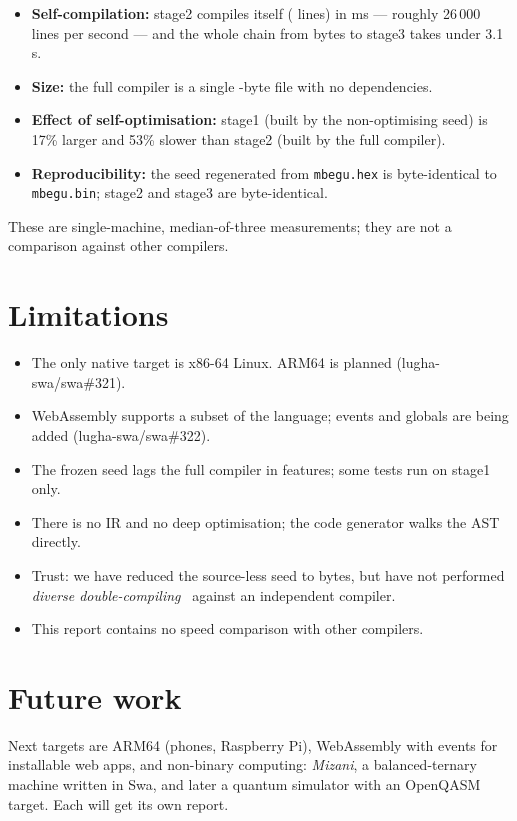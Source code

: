\documentclass[11pt,a4paper]{article}
\begin{document}
\begin{itemize}
  \item \textbf{Self-compilation:} stage2 compiles itself (\ZimaMistari{} lines) in \MudaStageMbili{} ms --- roughly 26\,000 lines per second --- and the whole chain from \KwanzaBaiti{} bytes to stage3 takes under 3.1\,s.
  \item \textbf{Size:} the full compiler is a single \StageMbiliBaiti-byte file with no dependencies.
  \item \textbf{Effect of self-optimisation:} stage1 (built by the non-optimising seed) is 17\% larger and 53\% slower than stage2 (built by the full compiler).
  \item \textbf{Reproducibility:} the seed regenerated from \texttt{mbegu.hex} is byte-identical to \texttt{mbegu.bin}; stage2 and stage3 are byte-identical.
\end{itemize}

\noindent These are single-machine, median-of-three measurements; they are not a comparison against other compilers.

\section{Limitations}

\begin{itemize}
  \item The only native target is x86-64 Linux. ARM64 is planned (lugha-swa/swa\#321).
  \item WebAssembly supports a subset of the language; events and globals are being added (lugha-swa/swa\#322).
  \item The frozen seed lags the full compiler in features; some tests run on stage1 only.
  \item There is no IR and no deep optimisation; the code generator walks the AST directly.
  \item Trust: we have reduced the source-less seed to \KwanzaBaiti{} bytes, but have not performed \emph{diverse double-compiling}~\cite{wheeler2009} against an independent compiler.
  \item This report contains no speed comparison with other compilers.
\end{itemize}

\section{Future work}

Next targets are ARM64 (phones, Raspberry Pi), WebAssembly with events for installable web apps, and non-binary computing: \emph{Mizani}, a balanced-ternary machine written in Swa, and later a quantum simulator with an OpenQASM target. Each will get its own report.
\end{document}
